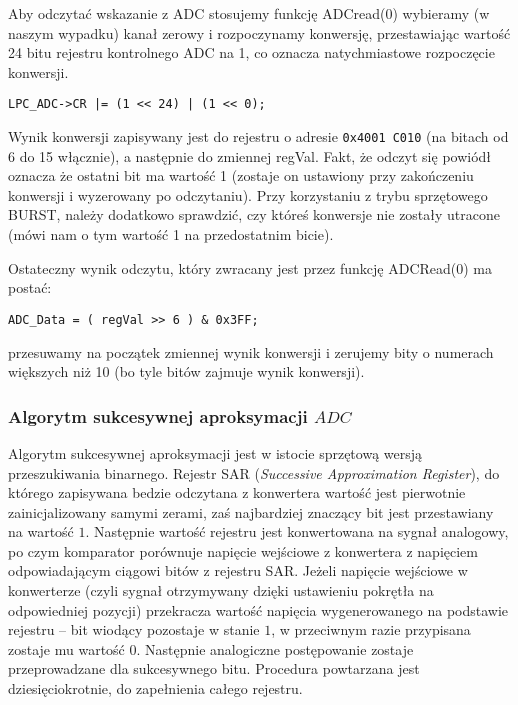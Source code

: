 \documentclass[a4paper,12pt,twoside]{article}
\theoremstyle{plain}
\theoremstyle{definition}
\theoremstyle{remark}
\begin{document}
Aby odczytać wskazanie z ADC stosujemy funkcję ADCread(0) wybieramy (w naszym wypadku) kanał zerowy i rozpoczynamy konwersję, przestawiając wartość 24 bitu rejestru kontrolnego ADC na 1, co oznacza natychmiastowe rozpoczęcie konwersji.
\begin{verbatim}
LPC_ADC->CR |= (1 << 24) | (1 << 0);
\end{verbatim}
Wynik konwersji zapisywany jest do rejestru o adresie \verb|0x4001 C010| (na bitach od 6 do 15 włącznie), a następnie do zmiennej regVal. Fakt, że odczyt się powiódł oznacza że ostatni bit ma wartość 1 (zostaje on ustawiony przy zakończeniu konwersji i wyzerowany po odczytaniu). Przy korzystaniu z trybu sprzętowego BURST, należy dodatkowo sprawdzić, czy któreś konwersje nie zostały utracone (mówi nam o tym wartość 1 na przedostatnim bicie).

Ostateczny wynik odczytu, który zwracany jest przez funkcję ADCRead(0)  ma postać:
\begin{verbatim}
ADC_Data = ( regVal >> 6 ) & 0x3FF;
\end{verbatim}
przesuwamy na początek zmiennej wynik konwersji i zerujemy bity o numerach większych niż 10 (bo tyle bitów zajmuje wynik konwersji).

	\subsubsection{Algorytm sukcesywnej aproksymacji $ADC$ \cite{ADCINST}}
	Algorytm sukcesywnej aproksymacji jest w istocie sprzętową wersją przeszukiwania binarnego. Rejestr SAR (\textit{Successive Approximation Register}), do którego zapisywana bedzie odczytana z konwertera wartość jest pierwotnie zainicjalizowany samymi zerami, zaś najbardziej znaczący bit jest przestawiany na wartość $1$. Następnie wartość rejestru jest konwertowana na sygnał analogowy, po czym komparator porównuje napięcie wejściowe z konwertera z napięciem odpowiadającym ciągowi bitów z rejestru SAR. Jeżeli napięcie wejściowe w konwerterze (czyli sygnał otrzymywany dzięki ustawieniu pokrętła na odpowiedniej pozycji) przekracza wartość napięcia wygenerowanego na podstawie rejestru -- bit wiodący pozostaje w stanie $1$, w przeciwnym razie przypisana zostaje mu wartość $0$. Następnie analogiczne postępowanie zostaje przeprowadzane dla sukcesywnego bitu. Procedura powtarzana jest dziesięciokrotnie, do zapełnienia całego rejestru.
\end{document}
